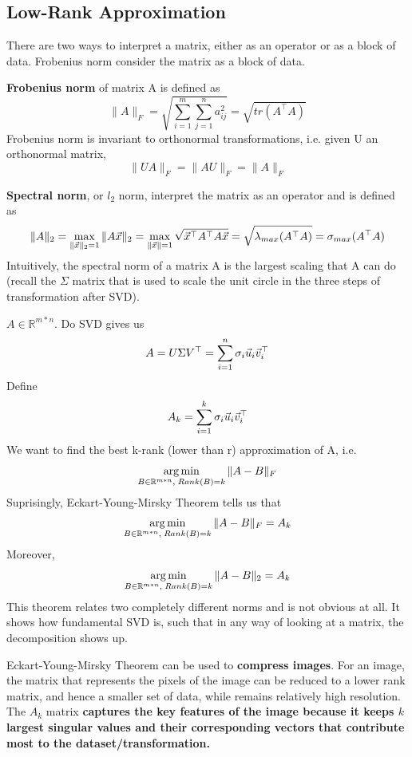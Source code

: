 
\subsection{Low-Rank Approximation} %
\label{sub:low_rank_approximation}

\begin{definition}
There are two ways to interpret a matrix, either as an operator or as a block of data. Frobenius norm consider the matrix as a block of data.
	
	\noindent\textbf{Frobenius norm} of matrix A is defined as
	\[
\|A\|_F = \sqrt{\sum_{i=1}^m\sum_{j=1}^na_{ij}^2} = \sqrt{tr(A^\top A)}
	\]
	Frobenius norm is invariant to orthonormal transformations, i.e. given U an orthonormal matrix,
	\[
\|UA\|_F = \|AU\|_F = \|A\|_F
	\]

	\noindent\textbf{Spectral norm}, or $l_2$ norm, interpret the matrix as an operator and is defined as
	\[
\|A\|_2 = \max_{\|\vec{x}\|_2=1}\|A\vec{x}\|_2 = \max_{\|\vec{x}\|=1}\sqrt{\vec{x}^\top A^\top A\vec{x}} = \sqrt{\lambda_{max}(A^\top A)} = \sigma_{max}(A^\top A)
	\]
	Intuitively, the spectral norm of a matrix A is the largest scaling that A can do (recall the $\Sigma$ matrix that is used to scale the unit circle in the three steps of transformation after SVD).
\end{definition}

\begin{theorem}
	$A \in \mathbb{R}^{m*n}$. Do SVD gives us
	\[
A = U \Sigma V^\top = \sum_{i=1}^n \sigma_i\vec{u}_i\vec{v}_i^\top
	\]
	Define
	\[
A_k = \sum_{i=1}^k \sigma_i\vec{u}_i\vec{v}_i^\top
	\]
	We want to find the best k-rank (lower than r) approximation of A, i.e.
	\[
\operatorname*{arg\,min}_{B\in \mathbb{R}^{m*n},\;Rank(B)=k}\|A-B\|_F
	\]
	Suprisingly, Eckart-Young-Mirsky Theorem tells us that
	\[
\operatorname*{arg\,min}_{B\in \mathbb{R}^{m*n},\;Rank(B)=k}\|A-B\|_F = A_k
	\]
	Moreover,
	\[
\operatorname*{arg\,min}_{B\in \mathbb{R}^{m*n},\;Rank(B)=k}\|A-B\|_2 = A_k
	\]
	This theorem relates two completely different norms and is not obvious at all. It shows how fundamental SVD is, such that in any way of looking at a matrix, the decomposition shows up.
\end{theorem}

\begin{remark}
	Eckart-Young-Mirsky Theorem can be used to \textbf{compress images}. For an image, the matrix that represents the pixels of the image can be reduced to a lower rank matrix, and hence a smaller set of data, while remains relatively high resolution. The $A_k$ matrix \textbf{captures the key features of the image because it keeps $k$ largest singular values and their corresponding vectors that contribute most to the dataset/transformation.}
\end{remark}

